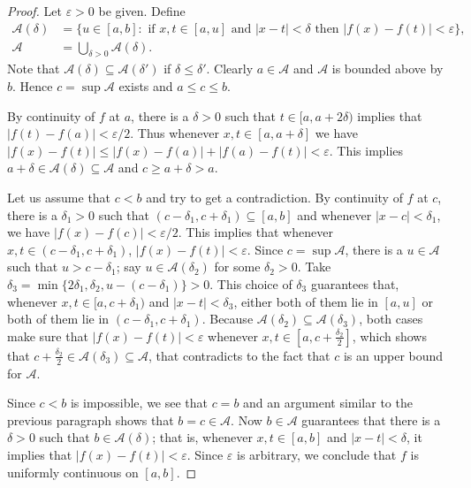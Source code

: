   \begin{proof} 
    Let $\varepsilon > 0$ be given.  Define
  \begin{align*}
    \mathcal A(\delta) &= \{ u \in [a,b] \colon \text{ if $x,t \in [a,u]$ and $|x-t| < \delta$ then $|f(x) - f(t)| < \varepsilon$} \}, \\
    \mathcal A &= \bigcup_{\delta>0} \mathcal A(\delta).
  \end{align*}
  Note that $\mathcal A(\delta) \subseteq \mathcal A(\delta')$ if $\delta \leqslant \delta'$.
  Clearly $a \in \mathcal A$ and $\mathcal A$ is bounded above by $b$.  Hence $c = \sup \mathcal A$ exists and $a \leqslant c \leqslant b$.

  By continuity of $f$ at $a$, there is a $\delta > 0$ such that $t \in [a, a+2\delta)$ implies that $|f(t) - f(a)| < \varepsilon/2$.
  Thus whenever $x,t \in [a,a+\delta]$ we have $|f(x)-f(t)| \leqslant |f(x)-f(a)| + |f(a)-f(t)| < \varepsilon$.  This implies $a + \delta \in \mathcal A(\delta) \subseteq \mathcal A$ and $c \geqslant a + \delta > a$.

  Let us assume that $c < b$ and try to get a contradiction.
  By continuity of $f$ at $c$, there is a $\delta_1 > 0$ such that $(c-\delta_1, c+\delta_1) \subseteq [a,b]$ and whenever $|x-c| < \delta_1$, we have $|f(x) - f(c)| < \varepsilon/2$.
  This implies that whenever $x,t \in (c-\delta_1, c+\delta_1)$, $|f(x)-f(t)| < \varepsilon$.
  Since $c = \sup \mathcal A$, there is a $u \in \mathcal A$ such that $u > c-\delta_1$; say $u \in \mathcal A(\delta_2)$ for some $\delta_2 > 0$.
  Take $\delta_3 = \min \{ 2\delta_1, \delta_2, u - (c - \delta_1) \} > 0$.
  This choice of $\delta_3$ guarantees that, whenever $x,t \in [a,c+\delta_1)$ and $|x-t| < \delta_3$, either both of them lie in $[a,u]$ or both of them lie in $(c-\delta_1, c+\delta_1)$.
  Because $\mathcal A(\delta_2) \subseteq \mathcal A(\delta_3)$, both cases make sure that $|f(x)-f(t)| < \varepsilon$ whenever $x,t \in [a, c+\frac{\delta_2}{2}]$, which shows that $c+\frac{\delta_2}{2} \in \mathcal A(\delta_3) \subseteq \mathcal A$, that contradicts to the fact that $c$ is an upper bound for $\mathcal A$.

  Since $c < b$ is impossible, we see that $c=b$ and an argument similar to the previous paragraph shows that $b = c \in \mathcal A$.
  Now $b \in \mathcal A$ guarantees that there is a $\delta > 0$ such that $b \in \mathcal A(\delta)$; that is, whenever $x,t \in [a,b]$ and $|x-t| < \delta$, it implies that $|f(x)-f(t)| < \varepsilon$.
  Since $\varepsilon$ is arbitrary, we conclude that $f$ is uniformly continuous on $[a,b]$.
  \end{proof}

